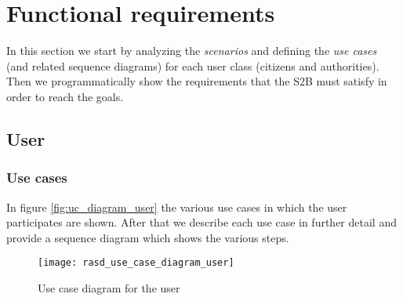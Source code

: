 \section{Functional requirements}
In this section we start by analyzing the \emph{scenarios} and defining
the \emph{use cases} (and related sequence diagrams) for each user class
(citizens and authorities).
Then we programmatically show the requirements that the S2B must satisfy in
order to reach the goals.

\subsection{User}


\subsubsection{Use cases}
In figure \vref{fig:uc_diagram_user} the various use cases in which the user
participates are shown.
After that we describe each use case in further detail and provide a sequence
diagram which shows the various steps.

\begin{figure}[h]
    \centering
    \texttt{[image: rasd\_use\_case\_diagram\_user]}
    \caption{Use case diagram for the user}
    \label{fig:uc_diagram_user}
\end{figure}

\clearpage


\clearpage

\clearpage

\clearpage


